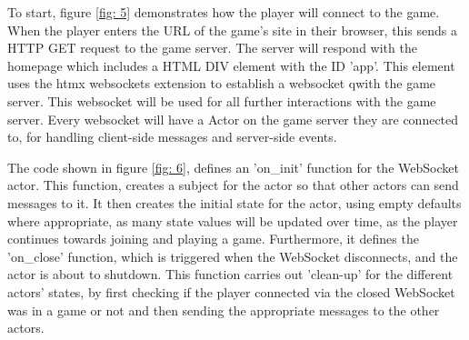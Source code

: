 \documentclass[]{interim}
\begin{document}
\noindent
\begin{minipage}[t]{18em}
  \vspace*{-6cm}

  To start, figure \ref{fig: 5} demonstrates how the player will connect to the game.
  When the player enters the URL of the game's site in their browser, this sends a HTTP
  GET request to the game server. The server will respond with the homepage which
  includes a HTML DIV element with the ID 'app'. This element uses the htmx websockets
  extension to establish a websocket qwith the game server. This websocket will be
  used for all further interactions with the game server. Every websocket will have a
  Actor on the game server they are connected to, for handling client-side messages and
  server-side events.

  \vspace{4em}

  The code shown in figure \ref{fig: 6}, defines an 'on\_init' function for the WebSocket actor. This function,
  creates a subject for the actor so that other actors can send messages to it.
  It then creates the initial state for the actor, using empty defaults where appropriate,
  as many state values will be updated over time, as the player continues towards
  joining and playing a game. Furthermore, it defines the 'on\_close' function,
  which is triggered when the WebSocket disconnects, and the actor is about to shutdown. This function carries out
  'clean-up' for the different actors' states, by first checking if the player
  connected via the closed WebSocket was in a game or not and then sending the
  appropriate messages to the other actors.

  \vspace{18em}

  \label{fig:6}

\end{minipage}
\hfill
\end{document}

